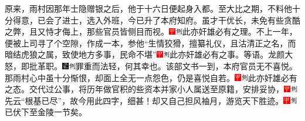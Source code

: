 {原来，雨村因那年士隐赠银之后，他于十六日便起身入都。至大比之期，不料他十分得意，已会了进士，选入外班，今已升了本府知府。虽才干优长，未免有些贪酷之弊，且又恃才侮上，那些官员皆侧目而视。{\includegraphics[width=3mm]{../Images/00002}\includegraphics[width=3mm]{../Images/00011}\footnotesize \kaishu 此亦奸雄必有之理。}不上一年，便被上司寻了个空隙，作成一本，参他``生情狡猾，擅纂礼仪，且沽清正之名，而暗结虎狼之属，致使地方多事，民命不堪''{\includegraphics[width=3mm]{../Images/00002}\includegraphics[width=3mm]{../Images/00011}\footnotesize \kaishu 此亦奸雄必有之事。}等语。龙颜大怒，即批革职。{\includegraphics[width=3mm]{../Images/00006}\includegraphics[width=3mm]{../Images/00011}\footnotesize \kaishu 罪重而法轻，何其幸也。}该部文书一到，本府官员无不喜悦。那雨村心中虽十分惭恨，却面上全无一点怨色，仍是喜悦自若。{\includegraphics[width=3mm]{../Images/00002}\includegraphics[width=3mm]{../Images/00011}\footnotesize \kaishu 此亦奸雄必有之态。}交代过公事，将历年做官积的些资本并家小人属送至原籍，安排妥协，{\includegraphics[width=3mm]{../Images/00002}\includegraphics[width=3mm]{../Images/00011}\footnotesize \kaishu 先云``根基已尽''，故今用此四字，细甚！}却又自己担风袖月，游览天下胜迹。{\includegraphics[width=3mm]{../Images/00002}\includegraphics[width=3mm]{../Images/00011}\footnotesize \kaishu 已伏下至金陵一节矣。}

}
